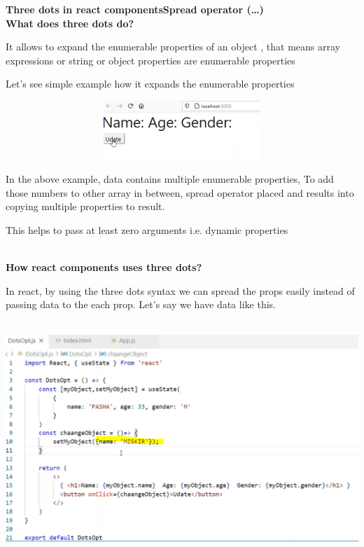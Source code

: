 \documentclass{article}
\begin{document}
\noindent 
{\large \textbf{Three dots in react components{\textbar}Spread operator ({\dots})}}
\\

\noindent \textbf{What does three dots do?}

\noindent It allows to expand the enumerable properties of an object , that means array expressions or string or object properties are enumerable properties

\noindent Let's see simple example how it expands the enumerable properties

\noindent \includegraphics*[width=6.19in, height=0.87in]{IMG-10-05}

\noindent In the above example, data contains multiple enumerable properties, To add those numbers to other array in between, spread operator placed and results into copying multiple properties to result.

\noindent This helps to pass at least zero arguments i.e. dynamic properties

\noindent \\
 \textbf{How react components uses three dots?}


\noindent In react, by using the three dots syntax we can spread the props easily instead of passing data to the each prop. Let's say we have data like this.

\noindent 

\noindent \includegraphics*[width=6.24in, height=3.47in]{IMG-10-06}
\end{document}
